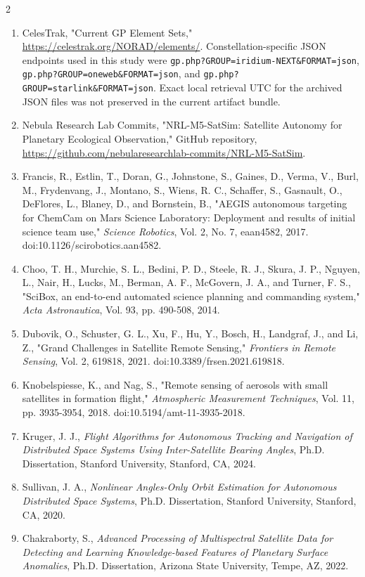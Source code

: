 \documentclass[fleqn,10pt,letterpaper]{article}
\begin{document}
\begin{multicols}{2}
\begin{enumerate}
\item CelesTrak, "Current GP Element Sets," \url{https://celestrak.org/NORAD/elements/}. Constellation-specific JSON endpoints used in this study were \texttt{gp.php?GROUP=iridium-NEXT\&FORMAT=json}, \texttt{gp.php?GROUP=oneweb\&FORMAT=json}, and \texttt{gp.php?GROUP=starlink\&FORMAT=json}. Exact local retrieval UTC for the archived JSON files was not preserved in the current artifact bundle.
\item Nebula Research Lab Commits, "NRL-M5-SatSim: Satellite Autonomy for Planetary Ecological Observation," GitHub repository, \url{https://github.com/nebularesearchlab-commits/NRL-M5-SatSim}.
\item Francis, R., Estlin, T., Doran, G., Johnstone, S., Gaines, D., Verma, V., Burl, M., Frydenvang, J., Montano, S., Wiens, R. C., Schaffer, S., Gasnault, O., DeFlores, L., Blaney, D., and Bornstein, B., "AEGIS autonomous targeting for ChemCam on Mars Science Laboratory: Deployment and results of initial science team use," \emph{Science Robotics}, Vol. 2, No. 7, eaan4582, 2017. doi:10.1126/scirobotics.aan4582.
\item Choo, T. H., Murchie, S. L., Bedini, P. D., Steele, R. J., Skura, J. P., Nguyen, L., Nair, H., Lucks, M., Berman, A. F., McGovern, J. A., and Turner, F. S., "SciBox, an end-to-end automated science planning and commanding system," \emph{Acta Astronautica}, Vol. 93, pp. 490-508, 2014.
\item Dubovik, O., Schuster, G. L., Xu, F., Hu, Y., Bosch, H., Landgraf, J., and Li, Z., "Grand Challenges in Satellite Remote Sensing," \emph{Frontiers in Remote Sensing}, Vol. 2, 619818, 2021. doi:10.3389/frsen.2021.619818.
\item Knobelspiesse, K., and Nag, S., "Remote sensing of aerosols with small satellites in formation flight," \emph{Atmospheric Measurement Techniques}, Vol. 11, pp. 3935-3954, 2018. doi:10.5194/amt-11-3935-2018.
\item Kruger, J. J., \emph{Flight Algorithms for Autonomous Tracking and Navigation of Distributed Space Systems Using Inter-Satellite Bearing Angles}, Ph.D. Dissertation, Stanford University, Stanford, CA, 2024.
\item Sullivan, J. A., \emph{Nonlinear Angles-Only Orbit Estimation for Autonomous Distributed Space Systems}, Ph.D. Dissertation, Stanford University, Stanford, CA, 2020.
\item Chakraborty, S., \emph{Advanced Processing of Multispectral Satellite Data for Detecting and Learning Knowledge-based Features of Planetary Surface Anomalies}, Ph.D. Dissertation, Arizona State University, Tempe, AZ, 2022.

\end{enumerate}
\end{multicols}
\end{document}
